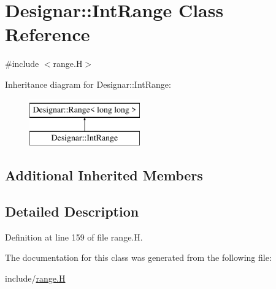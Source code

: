 \hypertarget{class_designar_1_1_int_range}{}\section{Designar\+:\+:Int\+Range Class Reference}
\label{class_designar_1_1_int_range}


{\ttfamily \#include $<$range.\+H$>$}

Inheritance diagram for Designar\+:\+:Int\+Range\+:\begin{figure}[H]
\begin{center}
\leavevmode
\includegraphics[height=2.000000cm]{class_designar_1_1_int_range}
\end{center}
\end{figure}
\subsection*{Additional Inherited Members}


\subsection{Detailed Description}


Definition at line 159 of file range.\+H.



The documentation for this class was generated from the following file\+:\begin{DoxyCompactItemize}
\item 
include/\hyperlink{range_8_h}{range.\+H}\end{DoxyCompactItemize}
